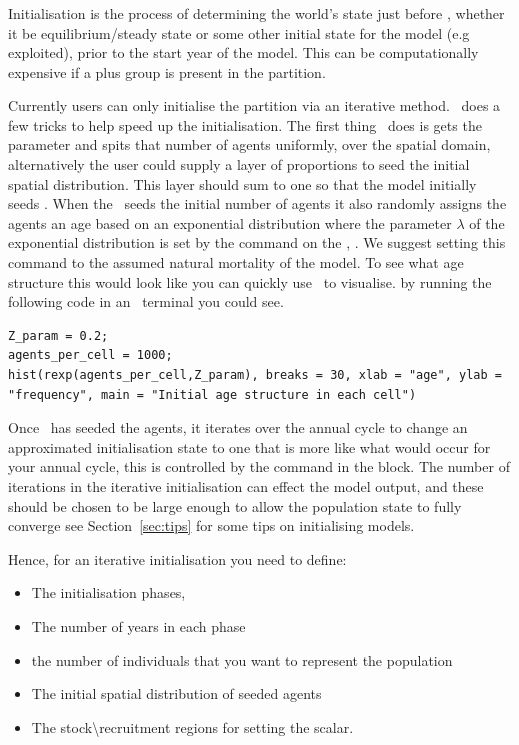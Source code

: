 \subsubsection{}\label{subsec:initialisation}
Initialisation is the process of determining the world's state just before , whether it be equilibrium/steady state or some other initial state for the model (e.g exploited), prior to the start year of the model. This can be computationally expensive if a plus group is present in the partition.

Currently users can only initialise the partition via an iterative method. \IBM\ does a few tricks to help speed up the initialisation. The first thing \IBM\ does is gets the parameter  and spits that number of agents uniformly, over the spatial domain, alternatively the user could supply a layer  of proportions to seed the initial spatial distribution. This layer should sum to one so that the model initially seeds . When the \IBM\ seeds the initial number of agents it also randomly assigns the agents an age based on an exponential distribution where the parameter $\lambda$ of the exponential distribution is set by the command on the , . We suggest setting this command to the assumed natural mortality of the model. To see what age structure this would look like you can quickly use \R\ to visualise. by running the following code in an \R\ terminal you could see.

\begin{lstlisting}
Z_param = 0.2;
agents_per_cell = 1000;
hist(rexp(agents_per_cell,Z_param), breaks = 30, xlab = "age", ylab = "frequency", main = "Initial age structure in each cell")
\end{lstlisting}

Once \IBM\ has seeded the agents, it iterates over the annual cycle to change an approximated initialisation state to one that is more like what would occur for your annual cycle, this is controlled by the  command in the  block. The number of iterations in the iterative initialisation can effect the model output, and these should be chosen to be large enough to allow the population state to fully converge see Section~\ref{sec:tips} for some tips on initialising models.

Hence, for an iterative initialisation you need to define:
\begin{itemize}
  \item The initialisation phases,
  \item The number of years in each phase
  \item the number of individuals that you want to represent the population
  \item The initial spatial distribution of seeded agents
  \item The stock\textbackslash recruitment regions for setting the scalar.
\end{itemize}

